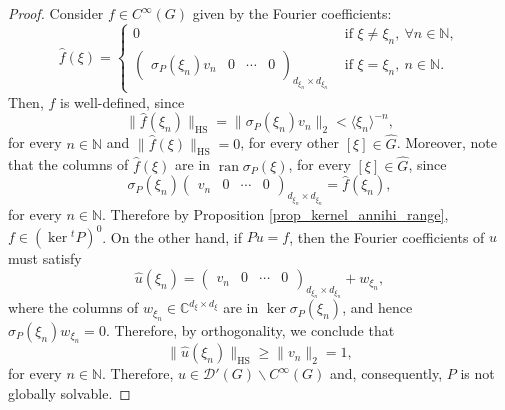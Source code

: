 \documentclass[10pt,a4paper]{amsart}
\newcommand{\C}{\mathbb{C}}
\newcommand{\HS}{\operatorname{HS}}
\newcommand{\N}{\mathbb{N}}
\begin{document}
\begin{proof}
Consider $f\in C^\infty(G)$ given by the Fourier coefficients:
\begin{equation*}
    \widehat{f}(\xi)=\begin{cases}
        0&\text{ if }\xi\neq \xi_n,\ \forall n\in\N,\\
        \begin{pmatrix}
            \sigma_P(\xi_n)v_n&0&\cdots&0 
        \end{pmatrix}_{d_{\xi_n}\times d_{\xi_n}}&\text{ if }\xi= \xi_n,\ n\in\N.
    \end{cases}
\end{equation*}
Then, $f$ is well-defined, since 
\begin{equation*}
    \|\widehat{f}(\xi_n)\|_{\HS}=\|\sigma_P(\xi_n)v_n\|_2<\langle \xi_n \rangle ^{-n},
\end{equation*}
for every $n\in\N$ and $ \|\widehat{f}(\xi)\|_{\HS}=0$, for every other $[\xi]\in\widehat{G}$. Moreover, note that the columns of $\widehat{f}(\xi)$ are in $ \operatorname{ran}\sigma_P(\xi)$, for every $[\xi]\in\widehat{G}$, since 
\begin{equation*}
    \sigma_P(\xi_n)\begin{pmatrix}
            v_n&0&\cdots&0 
        \end{pmatrix}_{d_{\xi_n}\times d_{\xi_n}}=\widehat{f}(\xi_n),
\end{equation*}
for every $n\in\N$. Therefore by Proposition \ref{prop_kernel_annihi_range}, $f\in (\ker {}^tP)^0$. On the other hand, if $Pu=f$, then  the Fourier coefficients of $u$ must satisfy
\begin{equation*}
    \widehat{u}(\xi_n)=
        \begin{pmatrix}
            v_n&0&\cdots&0 
        \end{pmatrix}_{d_{\xi_n}\times d_{\xi_n}}+w_{\xi_n},
\end{equation*}
where the columns of $w_{\xi_n}\in \C^{d_\xi\times d_\xi}$ are in $\ker \sigma_P(\xi_n)$, and hence $\sigma_P(\xi_n)w_{\xi_n}=0$. Therefore, by orthogonality, we conclude that 
\begin{equation*}
    \|\widehat{u}(\xi_n)\|_{\HS}\geq \|v_n\|_2=1,
\end{equation*}
for every $n\in\N$. Therefore,  $u\in\mathcal{D}'(G)\backslash C^\infty(G)$ and, consequently, $P$ is not globally solvable.
\end{proof}
\end{document}
